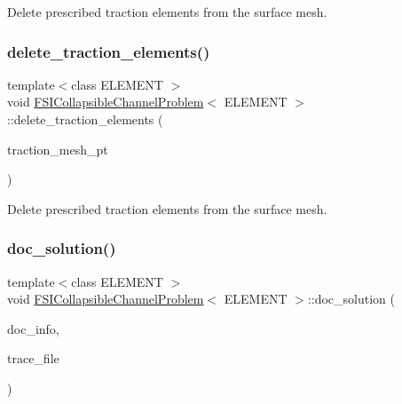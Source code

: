 Delete prescribed traction elements from the surface mesh. 

\mbox{\label{classFSICollapsibleChannelProblem_af1848415423aa824b91357922905a18f}} 
\subsubsection{\texorpdfstring{delete\+\_\+traction\+\_\+elements()}{delete\_traction\_elements()}\hspace{0.1cm}{\footnotesize\ttfamily [3/3]}}
{\footnotesize\ttfamily template$<$class E\+L\+E\+M\+E\+NT $>$ \\
void \hyperlink{classFSICollapsibleChannelProblem}{F\+S\+I\+Collapsible\+Channel\+Problem}$<$ E\+L\+E\+M\+E\+NT $>$\+::delete\+\_\+traction\+\_\+elements (\begin{DoxyParamCaption}\item[{Mesh $\ast$const \&}]{traction\+\_\+mesh\+\_\+pt }\end{DoxyParamCaption})\hspace{0.3cm}{\ttfamily [private]}}



Delete prescribed traction elements from the surface mesh. 

\mbox{\label{classFSICollapsibleChannelProblem_aff5cacbc8d81f6c1beda947085496462}} 
\subsubsection{\texorpdfstring{doc\+\_\+solution()}{doc\_solution()}\hspace{0.1cm}{\footnotesize\ttfamily [1/4]}}
{\footnotesize\ttfamily template$<$class E\+L\+E\+M\+E\+NT $>$ \\
void \hyperlink{classFSICollapsibleChannelProblem}{F\+S\+I\+Collapsible\+Channel\+Problem}$<$ E\+L\+E\+M\+E\+NT $>$\+::doc\+\_\+solution (\begin{DoxyParamCaption}\item[{Doc\+Info \&}]{doc\+\_\+info,  }\item[{ofstream \&}]{trace\+\_\+file }\end{DoxyParamCaption})}




